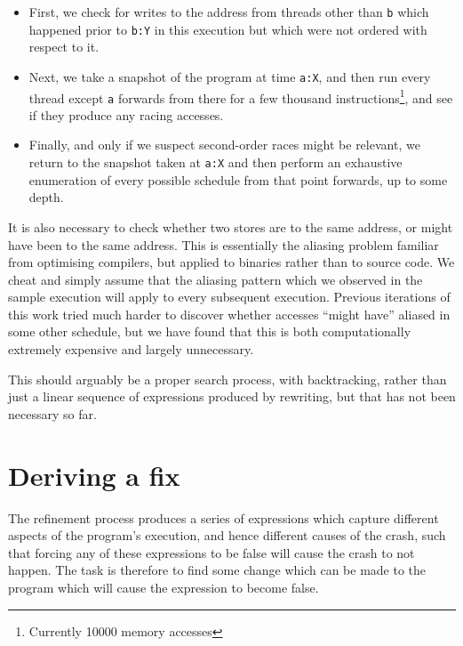 \documentclass[10pt,a4paper,twocolumn]{article}
\begin{document}
\begin{itemize}
\begin{itemize}
    \begin{itemize}
    \item First, we check for writes to the address from threads other
      than \verb|b| which happened prior to \verb|b:Y| in this
      execution but which were not ordered with respect to it.
    \item Next, we take a snapshot of the program at time \verb|a:X|,
      and then run every thread except \verb|a| forwards from there
      for a few thousand instructions\footnote{Currently 10000 memory
        accesses}, and see if they produce any racing accesses.
    \item Finally, and only if we suspect second-order races might be
      relevant, we return to the snapshot taken at \verb|a:X| and then
      perform an exhaustive enumeration of every possible schedule
      from that point forwards, up to some depth.
    \end{itemize}

    It is also necessary to check whether two stores are to the same
    address, or might have been to the same address.  This is
    essentially the aliasing problem familiar from optimising
    compilers, but applied to binaries rather than to source code.  We
    cheat and simply assume that the aliasing pattern which we
    observed in the sample execution will apply to every subsequent
    execution.  Previous iterations of this work tried much harder to
    discover whether accesses ``might have'' aliased in some other
    schedule, but we have found that this is both computationally
    extremely expensive and largely unnecessary.
  \end{itemize}
\end{itemize}

This should arguably be a proper search process, with backtracking,
rather than just a linear sequence of expressions produced by
rewriting, but that has not been necessary so far.

\section{Deriving a fix}

The refinement process produces a series of expressions which capture
different aspects of the program's execution, and hence different
causes of the crash, such that forcing any of these expressions to be
false will cause the crash to not happen.  The task is therefore to
find some change which can be made to the program which will cause the
expression to become false.
\end{document}
